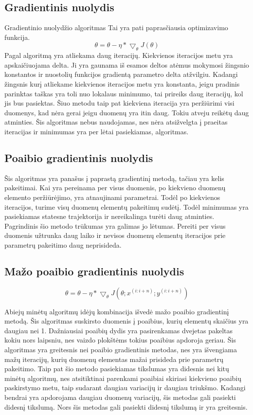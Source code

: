 \documentclass{VUMIFInfKursinis}
\begin{document}
\subsection{Gradientinis nuolydis}
Gradientinio nuolydžio algoritmas
Tai yra pati paprasčiausia optimizavimo funkcija.
\[
\theta = \theta - \eta * \bigtriangledown_{\theta}J(\theta)
\]
Pagal algoritmą yra atliekama daug iteracijų. Kiekvienos iteracijos metu yra
apskaičiuojama delta. Ji yra gaunama iš esamos deltos atėmus mokymosi žingsnio konstantos
ir nuostolių funkcijos gradientą parametro delta atžvilgiu. Kadangi žingsnis kurį
atliekame kiekvienos iteracijos metu yra konstanta, jeigu pradinis parinktas taškas
yra toli nuo lokalaus minimumo, tai prireiks daug iteracijų, kol jis bus pasiektas.
Šiuo metodu taip pat kiekviena iteracija yra peržiūrimi visi duomenys, kad nėra
gerai jeigu duomenų yra itin daug. \cite{salt8} Tokiu atveju reikėtų daug atminties. Šis algoritmas nebus naudojamas, nes nėra
atsižvelgta į praeitas iteracijas ir minimumas yra per lėtai pasiekiamas, algoritmas.

\subsection{Poaibio gradientinis nuolydis}
 Šis algoritmas yra panašus į paprastą gradientinį metodą, tačiau yra kelis pakeitimai.
 Kai yra pereinama per visus duomenis, po kiekvieno duomenų elemento peržiūrėjimo,
 yra atnaujinami parametrai. Todėl po kiekvienos iteracijos, turime visų duomenų
 elementų pakeitimų sudėtį. Todėl minimumas yra pasiekiamas statesne trajektorija ir
 nereikalinga turėti daug atminties. Pagrindinis šio metodo trūkumas yra galimas jo
 lėtumas. Pereiti per visus duomenis užtrunka daug laiko ir nevisos duomenų elementų
 iteracijos prie parametrų pakeitimo daug neprisideda. \cite{salt9}

\subsection{Mažo poaibio gradientinis nuolydis}
\[
\theta = \theta - \eta * \bigtriangledown_{\theta}J(\theta;x^{(i:i+n)};y^{(i:i+n)})
\]
\par
Abiejų minėtų algoritmų idėjų kombinacija išvedė mažo poaibio gradientinį metodą.
Šis algoritmas suskirsto duomenis į poaibius, kurių elementų skaičius yra daugiau nei 1.
Dažniausiai poaibių dydis yra pasirenkamas dvejetas pakeltas kokiu nors laipsniu, nes
vaizdo plokštėms tokius poaibius apdoroja geriau. Šis algoritmas yra greitesnis nei poaibio
gradientinis metodas, nes yra išvengiama mažų iteracijų, kurių duomenų elementas mažai
prisideda prie parametrų pakeitimo. Taip pat šio metodo pasiekiamas tikslumas yra didesnis
nei kitų minėtų algoritmų, nes atsitiktinai parenkami poaibiai skiriasi kiekvieno
poaibių paskirstymo metu, taip sudarant daugiau variacijų ir daugiau triukšmo. Kadangi
bendrai yra apdorojama daugiau duomenų variacijų, šis metodas gali pasiekti didesnį
tikslumą. Nors šis metodas gali pasiekti didesnį tikslumą ir yra greitesnis. \cite{salt9}
\end{document}
